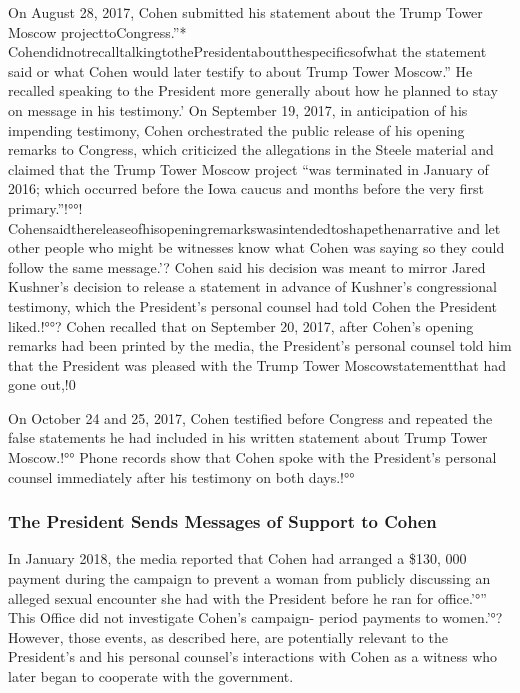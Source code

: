 On August 28, 2017, Cohen submitted his statement about the Trump Tower Moscow projecttoCongress.”* CohendidnotrecalltalkingtothePresidentaboutthespecificsofwhat the statement said or what Cohen would later testify to about Trump Tower Moscow.”
He recalled speaking to the President more generally about how he planned to stay on message in his testimony.'
On September 19, 2017, in anticipation of his impending testimony, Cohen orchestrated the public release of his opening remarks to Congress, which criticized the allegations in the Steele material and claimed that the Trump Tower Moscow project “was terminated in January of 2016; which occurred before the Iowa caucus and months before the very first primary.”!°°!
Cohensaidthereleaseofhisopeningremarkswasintendedtoshapethenarrative and let other people who might be witnesses know what Cohen was saying so they could follow the same message.'?
Cohen said his decision was meant to mirror Jared Kushner's decision to release a statement in advance of Kushner's congressional testimony, which the President's personal counsel had told Cohen the President liked.!°°?
Cohen recalled that on September 20, 2017, after Cohen's opening remarks had been printed by the media, the President's personal counsel told him that the President was pleased with the Trump Tower Moscowstatementthat had gone out,!0%

On October 24 and 25, 2017, Cohen testified before Congress and repeated the false statements he had included in his written statement about Trump Tower Moscow.!°°
Phone records show that Cohen spoke with the President's personal counsel immediately after his testimony on both days.!°°%

\subsubsection{The President Sends Messages of Support to Cohen}

In January 2018, the media reported that Cohen had arranged a \$130, 000 payment during the campaign to prevent a woman from publicly discussing an alleged sexual encounter she had with the President before he ran for office.'°”
This Office did not investigate Cohen's campaign- period payments to women.'°?
However, those events, as described here, are potentially relevant to the President's and his personal counsel's interactions with Cohen as a witness who later began to cooperate with the government.

